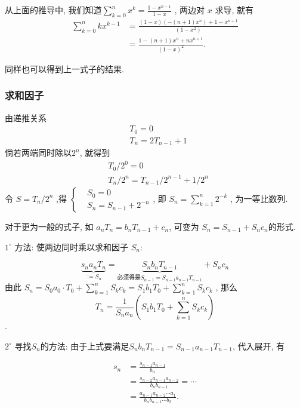 \documentclass{ctexart}
\begin{document}
\begin{example}
	从上面的推导中, 我们知道$\sum_{k=0}^n x^k=\frac{1-x^{n-1}}{1-x}$ , 两边对 $x$ 求导, 就有
	$$
		\begin{aligned}
			\sum_{k=0}^n k x^{k-1} & =\frac{(1-x)\left(-(n+1) x^n\right)+1-x^{n+1}}{\left(1-x^2\right)} \\
			                       & =\frac{1-(n+1) x^n+n x^{n+1}}{(1-x)^2} .
		\end{aligned}
	$$

	同样也可以得到上一式子的结果.
\end{example}

\subsubsection{求和因子}

\begin{example}
	由递推关系
	$$
		\begin{aligned}
			 & T_0=0           \\
			 & T_n=2 T_{n-1}+1
		\end{aligned}
	$$
	倘若两端同时除以$2^n$, 就得到
	$$
		\begin{aligned}
			 & T_0 / 2^0=0                         \\
			 & T_n / 2^n=T_{n-1} / 2^{n-1}+1 / 2^n
		\end{aligned}
	$$
	令 $S=T_n / 2^n$ ,得
	$\left\{\begin{aligned} & S_0=0 \\ & S_n=S_{n-1}+2^{-n}\end{aligned}\right.$, 即 $S_n=\sum_{k=1}^n 2^{-k}$ , 为一等比数列.
\end{example}

对于更为一般的式子, 如 $a_n T_n=b_n T_{n-1}+c_n$, 可变为 $S_n=S_{n-1}+ S_n c_n$的形式.

$1^\circ$ 方法: 使两边同时乘以求和因子 $S_n$:

\[
	\underbrace{\boxed{s_{n}a_{n}T_{n}}}_{:=S_{n}}=\underbrace{S_{n}b_{n}T_{n-1}}_{\text{必须得是}S_{n-1}=S_{n-1}a_{n-1}T_{n-1}}+S_{n}c_{n}
\]
由此 $S_n=S_0 a_0 \cdot T_0+\sum_{k=1}^n S_k c_k=S_1 b_1 T_0+\sum_{k=1}^n S_k c_k$ , 那么$$
	T_n=\frac{1}{S_n a_n}\left(S_1 b_1 T_0+\sum_{k=1}^n S_k c_k\right)
$$.

$2^\circ$ 寻找$S_n$的方法: 由于上式要满足$S_n b_n T_{n-1}=S_{n-1} a_{n-1} T_{n-1}$, 代入展开, 有

$$
	\begin{aligned}
		s_n & =\frac{s_{n-1} a_{n-1}}{b_n}                                 \\
		    & =\frac{s_{n-2} a_{n-1} a_{n-2}}{b_n b_{n-1}}=\cdots          \\
		    & =\frac{a_{n-1} a_{n-2} \cdots a_1}{b_n b_{n-1} \cdots b_2} .
	\end{aligned}
$$
\end{document}
